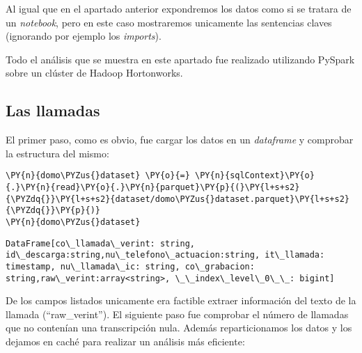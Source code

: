 Al igual que en el apartado anterior expondremos los datos como si se tratara de un \textit{notebook}, pero en este caso mostraremos unicamente las sentencias claves (ignorando por ejemplo los \textit{imports}). 

Todo el análisis que se muestra en este apartado fue realizado utilizando PySpark sobre un clúster de Hadoop Hortonworks.

\subsection{Las llamadas}



El primer paso, como es obvio, fue cargar los datos en un \textit{dataframe} y comprobar la estructura del mismo: 


\vspace{0.5cm}

\begin{tcolorbox}[breakable, size=fbox, boxrule=1pt, pad at break*=1mm,colback=cellbackground, colframe=cellborder]
\begin{Verbatim}[commandchars=\\\{\}]
\PY{n}{domo\PYZus{}dataset} \PY{o}{=} \PY{n}{sqlContext}\PY{o}{.}\PY{n}{read}\PY{o}{.}\PY{n}{parquet}\PY{p}{(}\PY{l+s+s2}{\PYZdq{}}\PY{l+s+s2}{dataset/domo\PYZus{}dataset.parquet}\PY{l+s+s2}{\PYZdq{}}\PY{p}{)}
\PY{n}{domo\PYZus{}dataset}
\end{Verbatim}
\end{tcolorbox}

 \begin{tcolorbox}[breakable, size=fbox, boxrule=.5pt, pad at break*=1mm, opacityfill=0]
\begin{Verbatim}[commandchars=\\\{\}]
DataFrame[co\_llamada\_verint: string, id\_descarga:string,nu\_telefono\_actuacion:string, it\_llamada: timestamp, nu\_llamada\_ic: string, co\_grabacion: string,raw\_verint:array<string>, \_\_index\_level\_0\_\_: bigint]
\end{Verbatim}
\end{tcolorbox}


De los campos listados unicamente era factible extraer información del texto de la llamada (``raw\_verint''). El siguiente paso fue comprobar el número de llamadas que no contenían una transcripción nula. Además reparticionamos los datos y los dejamos en caché para realizar un análisis más eficiente: 

